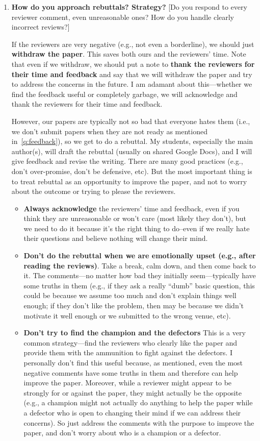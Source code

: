 \documentclass{article}
\begin{document}
\begin{enumerate}[label=\arabic*.]
        
    \item \textbf{How do you approach rebuttals? Strategy?} [Do you respond to every reviewer comment, even unreasonable ones? How do you handle clearly incorrect reviews?]
    
    If the reviewers are very negative (e.g., not even a borderline), we should just \textbf{withdraw the paper}. This saves both ours and the reviewers' time. Note that even if we withdraw, we should put a note to \textbf{thank the reviewers for their time and feedback} and say that we will withdraw the paper and try to address the concerns in the future. I am adamant about this---whether we find the feedback useful or completely garbage, we will acknowledge and thank the reviewers for their time and feedback.


    However, our papers are typically not so bad that everyone hates them (i.e., we don't submit papers when they are not ready as mentioned in~\autoref{q:feedback}), so we get to do a rebuttal. My students, especially the main author(s), will draft the rebuttal (usually on shared Google Docs), and I will give feedback and revise the writing. There are many good practices (e.g., don't over-promise, don't be defensive, etc). But the most important thing is to treat rebuttal as an opportunity to improve the paper, and not to worry about the outcome or trying to please the reviewers.

\begin{itemize}
    \item \textbf{Always acknowledge} the reviewers' time and feedback, even if you think they are unreasonable or won't care (most likely they don't), but we need to do it because it's the right thing to do--even if we really hate their questions and believe nothing will change their mind.
    
    \item \textbf{Don't do the rebuttal when we are emotionally upset (e.g., after reading the reviews)}. Take a break, calm down, and then come back to it. The comments---no matter how bad they initially seem---typically have some truths in them (e.g., if they ask a really ``dumb'' basic question, this could be because we assume too much and don't explain things well enough; if they don't like the problem, then may be because we didn't motivate it well enough or we submitted to the wrong venue, etc).


    \item \textbf{Don't try to find the champion and the defectors} This is a very common strategy---find the reviewers who clearly like the paper and provide them with the ammunition to fight against the defectors.  I personally don't find this useful because, as mentioned, even the most negative comments have some truths in them and therefore can help improve the paper. Moreover, while a reviewer might appear to be strongly for or against the paper, they might actually be the opposite (e.g., a champion might not actually do anything to help the paper while a defector who is open to changing their mind if we can address their concerns).  So just address the comments with the purpose to improve the paper, and don't worry about who is a champion or a defector.


\end{itemize}
\end{enumerate}
\end{document}
